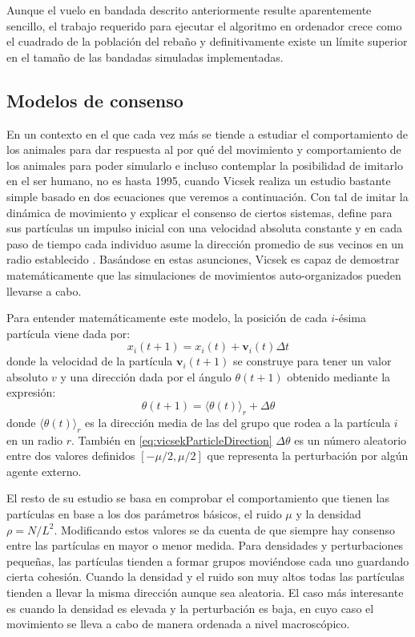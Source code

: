 Aunque el vuelo en bandada descrito anteriormente resulte aparentemente sencillo, el trabajo requerido para ejecutar el algoritmo en ordenador crece como el cuadrado de la población del rebaño y definitivamente existe un límite superior en el tamaño de las bandadas simuladas implementadas.

\subsection{Modelos de consenso}\label{s2_2_3}

En un contexto en el que cada vez más se tiende a estudiar el comportamiento de los animales para dar respuesta al por qué del movimiento y comportamiento de los animales para poder simularlo e incluso contemplar la posibilidad de imitarlo en el ser humano, no es hasta 1995, cuando Vicsek realiza un estudio bastante simple basado en dos ecuaciones que veremos a continuación. Con tal de imitar la dinámica de movimiento y explicar el consenso de ciertos sistemas, define para sus partículas un impulso inicial con una velocidad absoluta constante y en cada paso de tiempo cada individuo asume la dirección promedio de sus vecinos en un radio establecido \cite{vicsek1995novel}. Basándose en estas asunciones, Vicsek es capaz de demostrar matemáticamente que las simulaciones de movimientos auto-organizados pueden llevarse a cabo.

Para entender matemáticamente este modelo, la posición de cada \(i\)-ésima partícula viene dada por:
\begin{equation}\label{eq:vicsekParticlePosition}
    x_{i}(t+1)=x_{i}(t)+\mathbf{v}_{i}(t)\Delta t
\end{equation}
 donde la velocidad de la partícula $\mathbf{v}_{i}(t+1)$ se construye para tener un valor absoluto $v$ y una dirección dada por el ángulo $\theta (t+1)$ obtenido mediante la expresión: 
 \begin{equation}\label{eq:vicsekParticleDirection}
    \theta (t+1)=\langle\theta (t)\rangle _{r}+\Delta \theta
 \end{equation}
 donde $\langle \theta (t)\rangle _{r}$ es la dirección media de las del grupo que rodea a la partícula $i$ en un radio $r$. También en \ref{eq:vicsekParticleDirection} $\Delta \theta$ es un número aleatorio entre dos valores definidos $[-\mu /2 , \mu /2]$ que representa la perturbación por algún agente externo. 
 
 El resto de su estudio se basa en comprobar el comportamiento que tienen las partículas en base a los dos parámetros básicos, el ruido $\mu$ y la densidad $\rho = N/L^{2}$. Modificando estos valores se da cuenta de que siempre hay consenso entre las partículas en mayor o menor medida. Para densidades y perturbaciones pequeñas, las partículas tienden a formar grupos moviéndose cada uno guardando cierta cohesión. Cuando la densidad y el ruido son muy altos todas las partículas tienden a llevar la misma dirección aunque sea aleatoria. El caso más interesante es cuando la densidad es elevada y la perturbación es baja, en cuyo caso el movimiento se lleva a cabo de manera ordenada a nivel macroscópico. 
 
